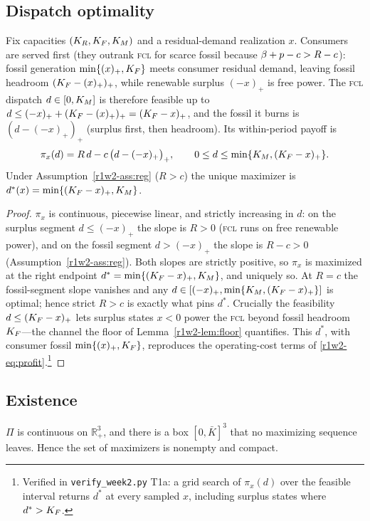 \subsection{Dispatch optimality}

\begin{lemma}\label{r1w2-lem:dispatch}
Fix capacities $(K_R,K_F,K_M)$ and a residual-demand realization $x$. Consumers are
served first (they outrank \textsc{fcl} for scarce fossil because $\beta+p-c>R-c$):
fossil generation $\min\{(x)_+,K_F\}$ meets consumer residual demand, leaving fossil
headroom $(K_F-(x)_+)_+$, while renewable surplus $(-x)_+$ is free power. The
\textsc{fcl} dispatch $d\in[0,K_M]$ is therefore feasible up to
$d\le(-x)_+ + (K_F-(x)_+)_+=(K_F-x)_+$, and the fossil it burns is $(d-(-x)_+)_+$
(surplus first, then headroom). Its within-period payoff is
\[
  \pi_x(d)=R\,d-c\,\big(d-(-x)_+\big)_+,\qquad 0\le d\le\min\{K_M,(K_F-x)_+\}.
\]
Under Assumption~\ref{r1w2-ass:reg} ($R>c$) the unique maximizer is
$d^{*}(x)=\min\{(K_F-x)_+,K_M\}$.
\end{lemma}

\begin{proof}
$\pi_x$ is continuous, piecewise linear, and strictly increasing in $d$: on the
surplus segment $d\le(-x)_+$ the slope is $R>0$ (\textsc{fcl} runs on free
renewable power), and on the fossil segment $d>(-x)_+$ the slope is $R-c>0$
(Assumption~\ref{r1w2-ass:reg}). Both slopes are strictly positive, so $\pi_x$ is
maximized at the right endpoint $d^{*}=\min\{(K_F-x)_+,K_M\}$, and uniquely so.
At $R=c$ the fossil-segment slope vanishes and any
$d\in[(-x)_+,\min\{K_M,(K_F-x)_+\}]$ is optimal; hence strict $R>c$ is exactly
what pins $d^{*}$. Crucially the feasibility $d\le(K_F-x)_+$ lets surplus states
$x<0$ power the \textsc{fcl} beyond fossil headroom $K_F$---the channel the floor
of Lemma~\ref{r1w2-lem:floor} quantifies. This $d^{*}$, with consumer fossil
$\min\{(x)_+,K_F\}$, reproduces the operating-cost terms of
\eqref{r1w2-eq:profit}.\footnote{Verified in \texttt{verify\_week2.py} T1a: a grid
search of $\pi_x(d)$ over the feasible interval returns $d^{*}$ at every sampled
$x$, including surplus states where $d^{*}>K_F$.}
\end{proof}

\subsection{Existence}

\begin{proposition}\label{r1w2-prop:exist}
$\Pi$ is continuous on $\mathbb R_{+}^{3}$, and there is a box $[0,\bar K]^{3}$
that no maximizing sequence leaves. Hence the set of maximizers is nonempty and
compact.
\end{proposition}

